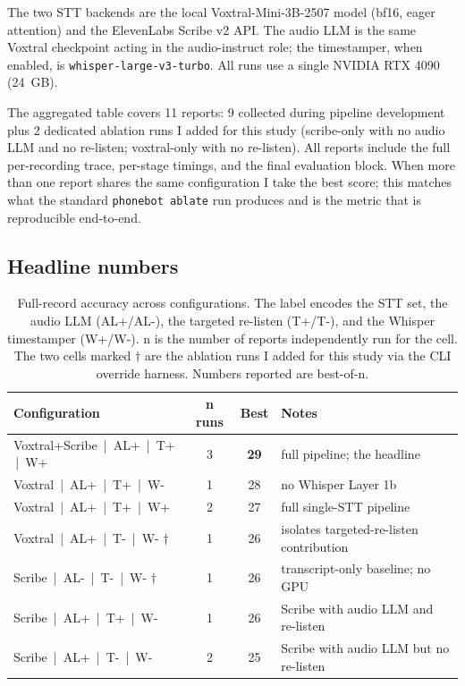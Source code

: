 \documentclass[11pt,a4paper]{article}
\begin{document}
The two STT backends are the local Voxtral-Mini-3B-2507 model (bf16,
eager attention) and the ElevenLabs Scribe v2 API. The audio LLM is
the same Voxtral checkpoint acting in the audio-instruct role; the
timestamper, when enabled, is \verb|whisper-large-v3-turbo|. All
runs use a single NVIDIA RTX 4090 (24~GB).

The aggregated table covers 11 reports: 9 collected during pipeline
development plus 2 dedicated ablation runs I added for this study
(scribe-only with no audio LLM and no re-listen; voxtral-only with
no re-listen). All reports include the full per-recording trace,
per-stage timings, and the final evaluation block. When more than
one report shares the same configuration I take the best score;
this matches what the standard \verb|phonebot ablate| run
produces and is the metric that is reproducible end-to-end.

\subsection{Headline numbers}

\begin{table}[h]
\centering
\caption{Full-record accuracy across configurations. The label encodes
the STT set, the audio LLM (\textsf{AL+}/\textsf{AL-}), the targeted
re-listen (\textsf{T+}/\textsf{T-}), and the Whisper timestamper
(\textsf{W+}/\textsf{W-}). \textsf{n} is the number of reports
independently run for the cell. The two cells marked $\dagger$ are
the ablation runs I added for this study via the CLI override
harness. Numbers reported are best-of-n.}
\label{tab:headline}
\small
\begin{tabularx}{\linewidth}{l c c X}
\toprule
\textbf{Configuration} & \textbf{n runs} & \textbf{Best} & \textbf{Notes}\\
\midrule
Voxtral+Scribe \,|\, AL+ \,|\, T+ \,|\, W+ & 3 & \textbf{29} & full pipeline; the headline \\
Voxtral \,|\, AL+ \,|\, T+ \,|\, W-          & 1 & 28          & no Whisper Layer 1b \\
Voxtral \,|\, AL+ \,|\, T+ \,|\, W+          & 2 & 27          & full single-STT pipeline \\
Voxtral \,|\, AL+ \,|\, T- \,|\, W- $\dagger$ & 1 & 26          & isolates targeted-re-listen contribution \\
Scribe \,|\, AL- \,|\, T- \,|\, W- $\dagger$ & 1 & 26          & transcript-only baseline; no GPU \\
Scribe \,|\, AL+ \,|\, T+ \,|\, W-          & 1 & 26          & Scribe with audio LLM and re-listen \\
Scribe \,|\, AL+ \,|\, T- \,|\, W-          & 2 & 25          & Scribe with audio LLM but no re-listen \\
\bottomrule
\end{tabularx}
\end{table}
\end{document}
